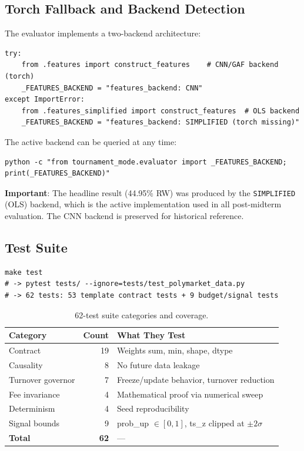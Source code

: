 \documentclass[11pt,letterpaper]{article}
\begin{document}
\subsection{Torch Fallback and Backend Detection}

The evaluator implements a two-backend architecture:

\begin{lstlisting}[style=python,
  caption={Torch fallback in \texttt{tournament\_mode/evaluator.py}.}]
try:
    from .features import construct_features    # CNN/GAF backend (torch)
    _FEATURES_BACKEND = "features_backend: CNN"
except ImportError:
    from .features_simplified import construct_features  # OLS backend
    _FEATURES_BACKEND = "features_backend: SIMPLIFIED (torch missing)"
\end{lstlisting}

The active backend can be queried at any time:
\begin{lstlisting}[style=bash, caption={Backend detection.}]
python -c "from tournament_mode.evaluator import _FEATURES_BACKEND; print(_FEATURES_BACKEND)"
\end{lstlisting}

\textbf{Important}: The headline result (44.95\% RW) was produced by the
\texttt{SIMPLIFIED} (OLS) backend, which is the active implementation used in
all post-midterm evaluation.  The CNN backend is preserved for historical
reference.

\subsection{Test Suite}

\begin{lstlisting}[style=bash, caption={Running the test suite.}]
make test
# -> pytest tests/ --ignore=tests/test_polymarket_data.py
# -> 62 tests: 53 template contract tests + 9 budget/signal tests
\end{lstlisting}

\begin{table}[H]
  \centering
  \caption{62-test suite categories and coverage.}
  \label{tab:tests}
  \begin{tabular}{lrl}
    \toprule
    \textbf{Category} & \textbf{Count} & \textbf{What They Test} \\
    \midrule
    Contract        & 19 & Weights sum, min, shape, dtype \\
    Causality       &  8 & No future data leakage \\
    Turnover governor& 7 & Freeze/update behavior, turnover reduction \\
    Fee invariance  &  4 & Mathematical proof via numerical sweep \\
    Determinism     &  4 & Seed reproducibility \\
    Signal bounds   &  9 & prob\_up $\in [0,1]$, ts\_z clipped at $\pm2\sigma$ \\
    \midrule
    \textbf{Total}  & \textbf{62} & --- \\
    \bottomrule
  \end{tabular}
\end{table}
\end{document}
